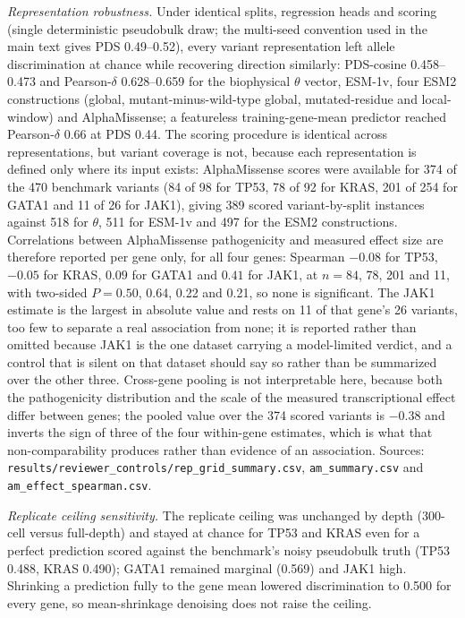\documentclass[11pt,letterpaper]{article}
\begin{document}
\smallskip
\noindent\textit{Representation robustness.} Under identical splits, regression heads and scoring (single deterministic pseudobulk draw; the multi-seed convention used in the main text gives PDS 0.49--0.52), every variant representation left allele discrimination at chance while recovering direction similarly: PDS-cosine 0.458--0.473 and Pearson-$\delta$ 0.628--0.659 for the biophysical $\theta$ vector, ESM-1v, four ESM2 constructions (global, mutant-minus-wild-type global, mutated-residue and local-window) and AlphaMissense; a featureless training-gene-mean predictor reached Pearson-$\delta$ 0.66 at PDS 0.44. The scoring procedure is identical across representations, but variant coverage is not, because each representation is defined only where its input exists: AlphaMissense scores were available for 374 of the 470 benchmark variants (84 of 98 for TP53, 78 of 92 for KRAS, 201 of 254 for GATA1 and 11 of 26 for JAK1), giving 389 scored variant-by-split instances against 518 for $\theta$, 511 for ESM-1v and 497 for the ESM2 constructions. Correlations between AlphaMissense pathogenicity and measured effect size are therefore reported per gene only, for all four genes: Spearman $-0.08$ for TP53, $-0.05$ for KRAS, $0.09$ for GATA1 and $0.41$ for JAK1, at $n = 84$, 78, 201 and 11, with two-sided $P = 0.50$, 0.64, 0.22 and 0.21, so none is significant. The JAK1 estimate is the largest in absolute value and rests on 11 of that gene's 26 variants, too few to separate a real association from none; it is reported rather than omitted because JAK1 is the one dataset carrying a model-limited verdict, and a control that is silent on that dataset should say so rather than be summarized over the other three. Cross-gene pooling is not interpretable here, because both the pathogenicity distribution and the scale of the measured transcriptional effect differ between genes; the pooled value over the 374 scored variants is $-0.38$ and inverts the sign of three of the four within-gene estimates, which is what that non-comparability produces rather than evidence of an association. Sources: \texttt{results/reviewer\_controls/rep\_grid\_summary.csv}, \texttt{am\_summary.csv} and \texttt{am\_effect\_spearman.csv}.

\smallskip
\noindent\textit{Replicate ceiling sensitivity.} The replicate ceiling was unchanged by depth (300-cell versus full-depth) and stayed at chance for TP53 and KRAS even for a perfect prediction scored against the benchmark's noisy pseudobulk truth (TP53 0.488, KRAS 0.490); GATA1 remained marginal (0.569) and JAK1 high. Shrinking a prediction fully to the gene mean lowered discrimination to 0.500 for every gene, so mean-shrinkage denoising does not raise the ceiling.
\end{document}
